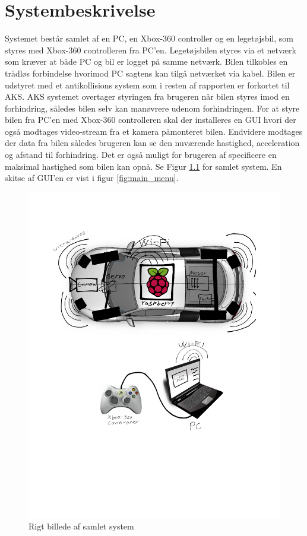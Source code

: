\chapter{Systembeskrivelse} \label{ch:Systembeskrivelse}
Systemet består samlet af en PC, en Xbox-360 controller og en legetøjsbil, som styres med Xbox-360 controlleren fra PC'en. Legetøjsbilen styres via et netværk som kræver at både PC og bil er logget på samme netværk. Bilen tilkobles en trådløs forbindelse hvorimod PC sagtens kan tilgå netværket via kabel. Bilen er udstyret med et antikollisions system som i resten af rapporten er forkortet til AKS. AKS systemet overtager styringen fra brugeren når bilen styres imod en forhindring, således bilen selv kan manøvrere udenom forhindringen. For at styre bilen fra PC'en med Xbox-360 controlleren skal der installeres en GUI hvori der også modtages video-stream fra et kamera påmonteret bilen. Endvidere modtages der data fra bilen således brugeren kan se den nuværende hastighed, acceleration og afstand til forhindring. Det er også muligt for brugeren af specificere en maksimal hastighed som bilen kan opnå. Se Figur \ref{fig:rigbillede} for samlet system. En skitse af GUI'en er vist i figur \ref{fig:main_menu}.
\begin{figure}[H]
\centering
\includegraphics[width=\textwidth - 7.38 cm]{../fig/billeder/rigbillede}
\caption{Rigt billede af samlet system}
\label{fig:rigbillede}
\end{figure} 
